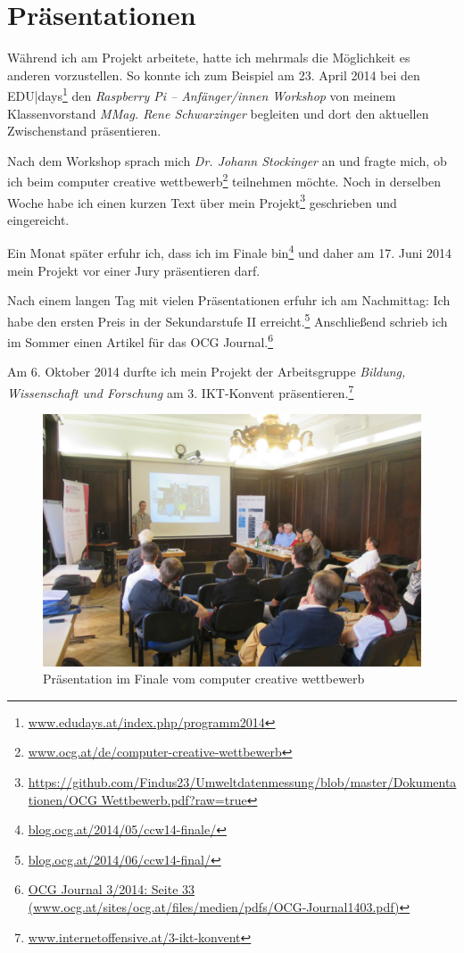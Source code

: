 \chapter{Präsentationen}
\label{anhang:präsentationen}

Während ich am Projekt arbeitete, hatte ich mehrmals die Möglichkeit es anderen vorzustellen. 
So konnte ich zum Beispiel am 23. April 2014 bei den \textsf{EDU|days}\footnote{\href{http://www.edudays.at/index.php/programm2014}{www.edudays.at/index.php/programm2014}} den \emph{Raspberry Pi -- Anfänger/innen Workshop} von meinem Klassenvorstand \emph{MMag. Rene Schwarzinger} begleiten und dort den aktuellen Zwischenstand präsentieren. 

Nach dem Workshop sprach mich \emph{Dr. Johann Stockinger} an und fragte mich, ob ich beim \textsf{computer creative wettbewerb}\footnote{\href{http://www.ocg.at/de/computer-creative-wettbewerb}{www.ocg.at/de/computer-creative-wettbewerb}}
teilnehmen möchte. Noch in derselben Woche habe ich einen kurzen Text über mein Projekt\footnote{\href{https://github.com/Findus23/Umweltdatenmessung/blob/master/Dokumentationen/OCG Wettbewerb.pdf?raw=true}{https://github.com/Findus23/Umweltdatenmessung/blob/master/Dokumentationen/OCG Wettbewerb.pdf?raw=true}}
geschrieben und eingereicht.

Ein Monat später erfuhr ich, dass ich im Finale bin\footnote{\href{http://blog.ocg.at/2014/05/ccw14-finale/}{blog.ocg.at/2014/05/ccw14-finale/}} und daher am 17. Juni 2014 mein Projekt vor einer Jury präsentieren darf. 

Nach einem langen Tag mit vielen Präsentationen erfuhr ich am Nachmittag: Ich habe den ersten Preis in der Sekundarstufe II erreicht.\footnote{\href{http://blog.ocg.at/2014/06/ccw14-final/}{blog.ocg.at/2014/06/ccw14-final/}}
Anschließend schrieb ich im Sommer einen Artikel für das OCG Journal.\footnote{\href{http://www.ocg.at/sites/ocg.at/files/medien/pdfs/OCG-Journal1403.pdf}{OCG Journal 3/2014: Seite 33 (www.ocg.at/sites/ocg.at/files/medien/pdfs/OCG-Journal1403.pdf)}}

Am 6. Oktober 2014 durfte ich mein Projekt der Arbeitsgruppe \textit{Bildung, Wissenschaft und Forschung} am \textsf{3. IKT-Konvent} präsentieren.\footnote{\href{http://www.internetoffensive.at/3-ikt-konvent}{www.internetoffensive.at/3-ikt-konvent}}

\begin{figure}[h]
	\centering
	\includegraphics[width=\textwidth]{figures/ocg.jpg}
	\caption{Präsentation im Finale vom \textsf{computer creative wettbewerb}}
\end{figure}	


